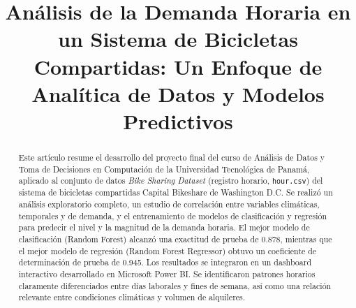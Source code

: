 \documentclass[conference]{IEEEtran}
\begin{document}
\title{Análisis de la Demanda Horaria en un Sistema de Bicicletas Compartidas: Un Enfoque de Analítica de Datos y Modelos Predictivos}

\author{
\and
{}
\and
{}
\and
{}
}

\maketitle

\begin{abstract}
Este artículo resume el desarrollo del proyecto final del curso de Análisis de Datos y Toma de Decisiones en Computación de la Universidad Tecnológica de Panamá, aplicado al conjunto de datos \textit{Bike Sharing Dataset} (registro horario, \texttt{hour.csv}) del sistema de bicicletas compartidas Capital Bikeshare de Washington D.C. Se realizó un análisis exploratorio completo, un estudio de correlación entre variables climáticas, temporales y de demanda, y el entrenamiento de modelos de clasificación y regresión para predecir el nivel y la magnitud de la demanda horaria. El mejor modelo de clasificación (Random Forest) alcanzó una exactitud de prueba de 0.878, mientras que el mejor modelo de regresión (Random Forest Regressor) obtuvo un coeficiente de determinación de prueba de 0.945. Los resultados se integraron en un dashboard interactivo desarrollado en Microsoft Power BI. Se identificaron patrones horarios claramente diferenciados entre días laborales y fines de semana, así como una relación relevante entre condiciones climáticas y volumen de alquileres.
\end{abstract}
\end{document}
